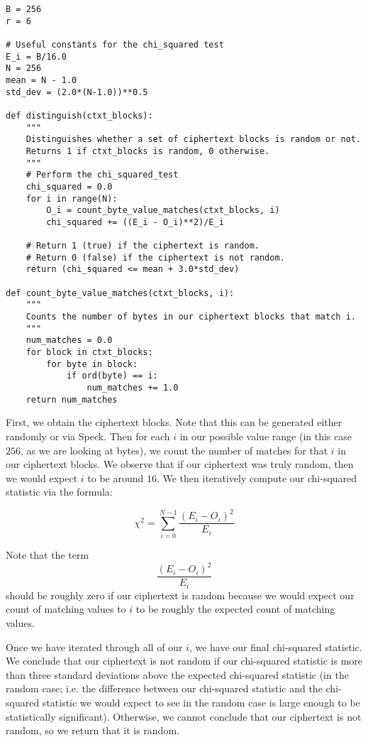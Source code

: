 \documentclass[11pt]{article}
\begin{document}
\begin{verbatim}
B = 256
r = 6

# Useful constants for the chi_squared test
E_i = B/16.0
N = 256
mean = N - 1.0
std_dev = (2.0*(N-1.0))**0.5

def distinguish(ctxt_blocks):
    """
    Distinguishes whether a set of ciphertext blocks is random or not.
    Returns 1 if ctxt_blocks is random, 0 otherwise.
    """
    # Perform the chi_squared_test
    chi_squared = 0.0
    for i in range(N):
        O_i = count_byte_value_matches(ctxt_blocks, i)
        chi_squared += ((E_i - O_i)**2)/E_i

    # Return 1 (true) if the ciphertext is random.
    # Return 0 (false) if the ciphertext is not random.
    return (chi_squared <= mean + 3.0*std_dev)

def count_byte_value_matches(ctxt_blocks, i):
    """
    Counts the number of bytes in our ciphertext blocks that match i.
    """
    num_matches = 0.0
    for block in ctxt_blocks:
        for byte in block:
            if ord(byte) == i:
                num_matches += 1.0
    return num_matches
\end{verbatim}

First, we obtain the ciphertext blocks. Note that this can be generated either randomly or via Speck. Then for each $i$ in our possible value range (in this case $256$, as we are looking at bytes), we count the number of matches for that $i$ in our ciphertext blocks. We observe that if our ciphertext was truly random, then we would expect $i$ to be around $16$. We then iteratively compute our chi-squared statistic via the formula: 

$$\chi^2= \sum^{N-1}_{i=0} \frac{(E_i - O_i)^2}{E_i}$$

Note that the term $$\frac{(E_i - O_i)^2}{E_i}$$ should be roughly zero if our ciphertext is random because we would expect our count of matching values to $i$ to be roughly the expected count of matching values.

Once we have iterated through all of our $i$, we have our final chi-squared statistic. We conclude that our ciphertext is not random if our chi-squared statistic is more than three standard deviations above the expected chi-squared statistic (in the random case; i.e. the difference between our chi-squared statistic and the chi-squared statistic we would expect to see in the random case is large enough to be statistically significant). Otherwise, we cannot conclude that our ciphertext is not random, so we return that it is random. 
\end{document}
